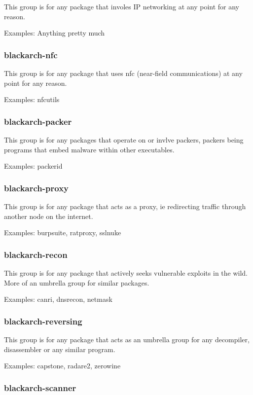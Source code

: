 \documentclass[a4paper, oneside, 11pt]{book}
\begin{document}
This group is for any package that involes IP networking at any point for any reason.

Examples: Anything pretty much

\subsubsection{blackarch-nfc}

This group is for any package that uses nfc (near-field communications) at any point for any reason.

Examples: nfcutils

\subsubsection{blackarch-packer}

This group is for any packages that operate on or invlve packers, packers being programs that embed malware within other executables.

Examples: packerid

\subsubsection{blackarch-proxy}

This group is for any package that acts as a proxy, ie redirecting traffic through another node on the internet.

Examples: burpsuite, ratproxy, sslnuke

\subsubsection{blackarch-recon}

This group is for any package that actively seeks vulnerable exploits in the wild. More of an umbrella group for similar packages.

Examples: canri, dnsrecon, netmask

\subsubsection{blackarch-reversing}

This group is for any package that acts as an umbrella group for any decompiler, disassembler or any similar program.

Examples: capstone, radare2, zerowine

\subsubsection{blackarch-scanner}
\end{document}

